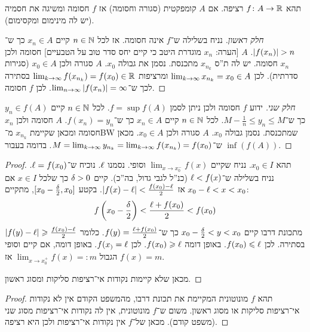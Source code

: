 \documentclass[name=רשימות חשבון דיפרנציאלי ואינטגרלי 1א]{../../../tex/classes/megasumPreamble}
\begin{document}
	\begin{Theorem}
		תהא $f \colon A \to \mathbb{R}$ רציפה. אם $A$ קומפקטית (סגורה וחסומה) אז $f$ חסומה ומשיגה את חסמיה (יש לה מינימום ומקסימום).
	\end{Theorem}
	\begin{proof}[חלק ראשון]
		נניח בשלילה ש־$f$ אינה חסומה. אז לכל $n \in \mathbb{N}$ קיים $x_n \in A$ כך ש־$\left \lvert f(x_n) \right \rvert > n$. $A$ [הערה: $x_n$ מוגדרת היטב כי קיים יחס סדר טוב על הטבעיים] חסומה ולכן $x_n$ חסומה. יש לה ת''ס $x_{n_k}$ מתכנסת. נסמן את גבולה $x_0$. $A$ סגורה ולכן $x_0 \in A$ (סגירות סדרתית). לכן $\lim_{k \to \infty} x_{n_k} = x_0 \in A$ ומרציפות $\lim_{k \to \infty} f(x_{n_k}) = f(x_0) \in \mathbb{R}$ בסתירה לכך ש־$\lim_{n \to \infty} \left \lvert f(x_n) \right \rvert = \infty$. לכן $f$ חסומה.
	\end{proof}
	\begin{proof}[חלק שני]
		ידוע $f$ חסומה ולכן ניתן לסמן $f = \sup f(A)$. לכל $n \in \mathbb{N}$ קיים $y_n \in f(A)$ כך ש־$M - \frac{1}{n} \le y_n \le M$. לכל $n \in \mathbb{N}$ קיים $x_n \in A$ כך ש־$f(x_n) = y_n$. $A$ חסומה ולכן $x_n$ חסומה ומכאן שקיימת $x_{n_k}$ מ־BW שמתכנסת. נסמן גבולה $x_0$. $A$ סגורה ולכן $x_0 \in A$. מכאן ש־$M = \lim_{k \to \infty} y_{n_k} = \lim_{k \to \infty} f(x_{n_k}) = f(x_0)$. בדומה בעבור $\inf (f(A))$.
	\end{proof}

	\begin{proof}
		תהא $x_0 \in I$. נניח שקיים $\lim_{x \to x_0^{-}} f(x)$ וסופי. נסמנו $\ell$. נוכיח ש־$\ell = f(x_0)$. נניח בשלילה ש־$\ell < f(x)$ (כנ''ל לגבי גדול, בה''כ). קיים $\delta > 0$ כך שלכל $x \in I$ אם $x_0 - \ell < x < x_0$ אז $\left \lvert f(x) - \ell \right \rvert < \frac{f(x_0) - \ell}{2}$. בקטע $[x_0 - \frac{\delta}{2}, x_0]$, מתקיים:
		\[ f\left ( x_0 - \frac{\delta}{2} \right ) < \frac{\ell + f(x_0)}{2} < f(x_0) \]
		מתכונת דרבו קיים $x_0 - \frac{\delta}{2} < y < x_0$ כך ש־$f(y) = \frac{\ell + f(x_0)}{2}$. כלומר $\left \lvert f(y) - \ell \right \rvert \geqslant \frac{f(x_0) - \ell}{2}$ בסתירה. לכן $f(x_0) \leqslant \ell$. באופן דומה $f(x_0) \geqslant \ell$. לכן $f(x_) = \ell$. באופן דומה, אם קיים וסופי הגבול $\lim_{x \to x_0^{+}} f(x) =: m$ אז $f(x) = m$.

		מכאן שלא קיימות נקודות אי־רציפות סליקות ומסוג ראשון.
	\end{proof}

	\begin{proof}
		תהא $f$ מונוטונית המקיימת את תכונת דרבו, מהמשפט הקודם אין לא נקודות אי־רציפות סליקות או מסוג ראשון. משום ש־$f$ מונוטונית, אין לה נקודות אי־רציפות מסוג שני (משפט קודם). מכאן של־$f$ אין נקודות אי־רציפות ולכן היא רציפה.
	\end{proof}
	
\end{document}
